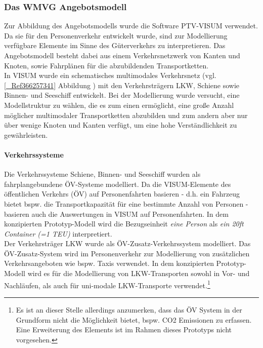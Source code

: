 \subsubsection{Das WMVG Angebotsmodell}
\label{_Toc366766117}
\label{_Toc366775311}
Zur Abbildung des Angebotsmodells wurde die Software PTV-VISUM verwendet. Da sie für den Personenverkehr entwickelt wurde, sind zur Modellierung verfügbare Elemente im Sinne des Güterverkehrs zu interpretieren. Das Angebotsmodell besteht dabei aus einem Verkehrsnetzwerk von Kanten und Knoten, sowie Fahrplänen für die abzubildenden Transportketten.~\\
In VISUM wurde ein schematisches multimodales Verkehrsnetz (vgl. \autoref{_Ref366257341} Abbildung ) mit den Verkehrsträgern LKW, Schiene sowie Binnen- und Seeschiff entwickelt. Bei der Modellierung wurde versucht, eine Modellstruktur zu wählen, die es zum einen ermöglicht, eine große Anzahl möglicher multimodaler Transportketten abzubilden und zum andern aber nur über wenige Knoten und Kanten verfügt, um eine hohe Verständlichkeit zu gewährleisten. ~\\


% 
\paragraph{Verkehrssysteme}
Die Verkehrssysteme Schiene, Binnen- und Seeschiff wurden als fahrplangebundene ÖV-Systeme modelliert. Da die VISUM-Elemente des öffentlichen Verkehrs (ÖV) auf Personenfahrten basieren - d.h. ein Fahrzeug bietet bspw. die Transportkapazität für eine bestimmte Anzahl von Personen - basieren auch die Auswertungen in VISUM auf Personenfahrten. In dem konzipierten Prototyp-Modell wird die Bezugseinheit \emph{eine Person} als \emph{ein 20ft Container (=1 TEU)} interpretiert.~\\
Der Verkehrsträger LKW wurde als ÖV-Zusatz-Verkehrssystem modelliert. Das ÖV-Zusatz-System wird im Personenverkehr zur Modellierung von zusätzlichen Verkehrsangeboten wie bspw. Taxis verwendet. In dem konzipierten Prototyp-Modell wird es für die Modellierung von LKW-Transporten sowohl in Vor- und Nachläufen, als auch für uni-modale LKW-Transporte verwendet.\footnote{%
 Es ist an dieser Stelle allerdings anzumerken, dass das ÖV System in der Grundform nicht die Möglichkeit bietet, bspw. CO2 Emissionen zu erfassen. Eine Erweiterung des Elements ist im Rahmen dieses Prototyps nicht vorgesehen.
}%
~\\


% 
